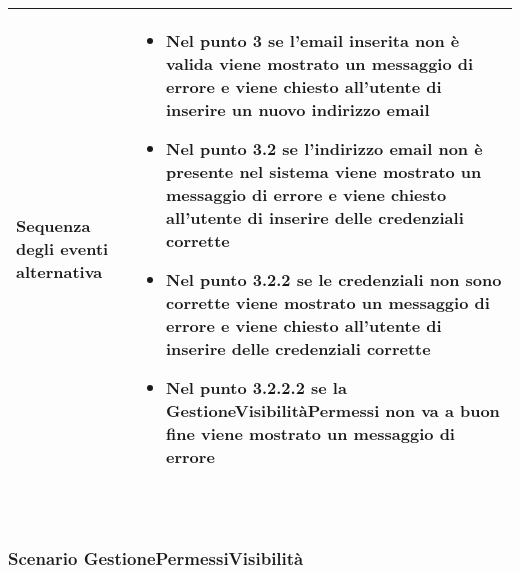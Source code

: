 \begin{tabular}{|p{3cm}|p{7cm}|}
\hline
  Sequenza degli eventi alternativa & \begin{itemize}
  \item Nel punto 3 se l'email inserita non è valida viene mostrato un messaggio di
errore e viene chiesto all'utente di inserire un nuovo indirizzo email
\item Nel punto 3.2 se l'indirizzo email non è presente nel sistema viene mostrato un
messaggio di errore e viene chiesto all'utente di inserire delle credenziali corrette
\item Nel punto 3.2.2 se le credenziali non sono corrette viene mostrato un messaggio
di errore e viene chiesto all'utente di inserire delle credenziali corrette
\item Nel punto 3.2.2.2 se la GestioneVisibilitàPermessi non va a buon fine
viene mostrato un messaggio di errore
\end{itemize}\\
\hline
\end{tabular}\\

\subsubsection{Scenario GestionePermessiVisibilità}

